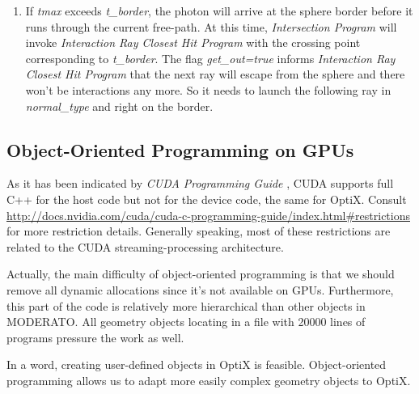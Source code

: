\begin{enumerate}
{  }
  \item{
If \textit{tmax} exceeds \textit{t\_border}, the photon will arrive at the sphere border before it runs through the current free-path. At this time, \textit{Intersection Program} will invoke \textit{Interaction Ray Closest Hit Program} with the crossing point corresponding to \textit{t\_border}. The flag \textit{get\_out=true} informs \textit{Interaction Ray Closest Hit Program} that the next ray will escape from the sphere and there won't be interactions any more. So it needs to launch the following ray in \textit{normal\_type} and right on the border.
  }
\end{enumerate}

\subsection{Object-Oriented Programming on GPUs}
As it has been indicated by \textit{CUDA Programming Guide} \citep{cudaguide}, CUDA supports full C++ for the host code but not for the device code, the same for OptiX. Consult \href{http://docs.nvidia.com/cuda/cuda-c-programming-guide/index.html#restrictions}{http://docs.nvidia.com/cuda/cuda-c-programming-guide/index.html\#restrictions} for more restriction details. Generally speaking, most of these restrictions are related to the CUDA streaming-processing architecture.

Actually, the main difficulty of object-oriented programming is that we should remove all dynamic allocations since it's not available on GPUs. Furthermore, this part of the code is relatively more hierarchical than other objects in MODERATO. All geometry objects locating in a file with 20000 lines of programs pressure the work as well.

In a word, creating user-defined objects in OptiX is feasible. Object-oriented programming allows us to adapt more easily complex geometry objects to OptiX.

